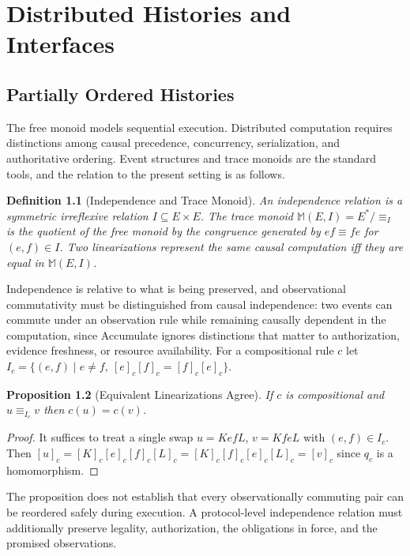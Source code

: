 \documentclass[12pt,oneside,openany]{book}
\theoremstyle{spherepop}
\newtheorem{definition}{Definition}[chapter]
\newtheorem{proposition}[definition]{Proposition}
\theoremstyle{remarkstyle}
\begin{document}
\chapter{Distributed Histories and Interfaces}
\label{ch:distributed}

\section{Partially Ordered Histories}

The free monoid models sequential execution. Distributed computation requires distinctions among causal precedence, concurrency, serialization, and authoritative ordering. Event structures \cite{winskel} and trace monoids \cite{diekert} are the standard tools, and the relation to the present setting is as follows.

\begin{definition}[Independence and Trace Monoid]
An \emph{independence relation} is a symmetric irreflexive relation $I\subseteq E\times E$. The \emph{trace monoid} $\mathbb M(E,I)=E^*/{\equiv_I}$ is the quotient of the free monoid by the congruence generated by $ef\equiv fe$ for $(e,f)\in I$. Two linearizations represent the same causal computation iff they are equal in $\mathbb M(E,I)$.
\end{definition}

Independence is relative to what is being preserved, and observational commutativity must be distinguished from causal independence: two events can commute under an observation rule while remaining causally dependent in the computation, since Accumulate ignores distinctions that matter to authorization, evidence freshness, or resource availability. For a compositional rule $c$ let $I_c=\{(e,f)\mid e\ne f,\ [e]_c[f]_c=[f]_c[e]_c\}$.

\begin{proposition}[Equivalent Linearizations Agree]
\label{prop:linearizations}
If $c$ is compositional and $u\equiv_{I_c}v$ then $c(u)=c(v)$.
\end{proposition}

\begin{proof}
It suffices to treat a single swap $u=Kef L$, $v=Kfe L$ with $(e,f)\in I_c$. Then $[u]_c=[K]_c[e]_c[f]_c[L]_c=[K]_c[f]_c[e]_c[L]_c=[v]_c$ since $q_c$ is a homomorphism.
\end{proof}

The proposition does not establish that every observationally commuting pair can be reordered safely during execution. A protocol-level independence relation must additionally preserve legality, authorization, the obligations in force, and the promised observations.
\end{document}
